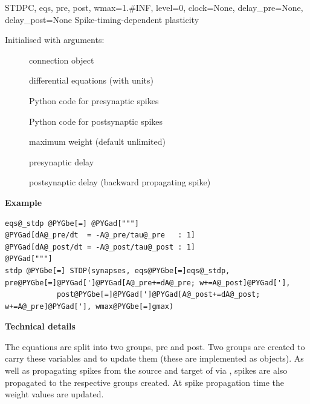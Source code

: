 \documentclass[letterpaper,10pt,english]{manual}
\begin{document}
\hypertarget{brian.STDP}{}\begin{classdesc}{STDP}{C, eqs, pre, post, wmax=1.\#INF, level=0, clock=None, delay\_pre=None, delay\_post=None}
Spike-timing-dependent plasticity

Initialised with arguments:
\begin{description}
\item[]
connection object

\item[]
differential equations (with units)

\item[]
Python code for presynaptic spikes

\item[]
Python code for postsynaptic spikes

\item[]
maximum weight (default unlimited)

\item[]
presynaptic delay

\item[]
postsynaptic delay (backward propagating spike)

\end{description}

\textbf{Example}

\begin{Verbatim}[commandchars=@\[\]]
eqs@_stdp @PYGbe[=] @PYGad["""]
@PYGad[dA@_pre/dt  = -A@_pre/tau@_pre   : 1]
@PYGad[dA@_post/dt = -A@_post/tau@_post : 1]
@PYGad["""]
stdp @PYGbe[=] STDP(synapses, eqs@PYGbe[=]eqs@_stdp, pre@PYGbe[=]@PYGad[']@PYGad[A@_pre+=dA@_pre; w+=A@_post]@PYGad['],
            post@PYGbe[=]@PYGad[']@PYGad[A@_post+=dA@_post; w+=A@_pre]@PYGad['], wmax@PYGbe[=]gmax)
\end{Verbatim}

\textbf{Technical details}

The equations are split into two groups, pre and post. Two groups are created
to carry these variables and to update them (these are implemented as
\hyperlink{brian.NeuronGroup}{} objects). As well as propagating spikes from the source
and target of  via , spikes are also propagated to the respective
groups created. At spike propagation time the weight values are updated.
\end{classdesc}
\end{document}
